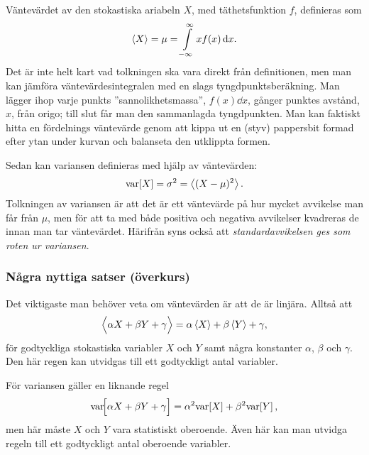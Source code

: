 \documentclass[11pt,a4paper, english, swedish
]{article}
\newcommand{\VAR}[1]{\ensuremath\text{var}\!\left[#1\right]}
\begin{document}
Väntevärdet av den stokastiska ariabeln $X$, med täthetsfunktion $f$,
definieras som 
\begin{equation}\label{eq:ev}
\ev{X} = \mu = \int_{-\infty}^\infty x f(x)\id{x}.
\end{equation}
Det är inte helt kart vad tolkningen ska vara direkt från
definitionen, men man kan jämföra väntevärdesintegralen med en slags
tyngdpunktsberäkning. Man lägger ihop varje punkts
''sannolikhetsmassa'', $f(x)\dd{x}$, gånger punktes avstånd, $x$, från
origo; till slut får man den sammanlagda tyngdpunkten. Man kan
faktiskt hitta en fördelnings väntevärde genom att kippa ut en (styv)
pappersbit formad efter ytan under kurvan och balanseta den utklippta formen. 

Sedan kan variansen definieras med hjälp av väntevärden:
\begin{equation}\label{eq:var}
\VAR{X} = \sigma^2 =\ev{(X-\mu)^2}. %
\end{equation}
Tolkningen av variansen är att det är ett väntevärde på hur
mycket avvikelse man får från $\mu$, men för att ta med både positiva
och negativa avvikelser kvadreras de innan man tar väntevärdet.
Härifrån syns också att \emph{standardavvikelsen ges som roten ur
variansen}. 

\subsubsection{Några nyttiga satser (överkurs)}
Det viktigaste man behöver veta om väntevärden är att de är
linjära. Alltså att
\begin{equation}\label{eq:ev_lin}
\Big\langle \alpha X + \beta Y + \gamma \Big\rangle 
= \alpha\ev{X} + \beta\ev{Y} + \gamma,
\end{equation}
för godtyckliga stokastiska variabler $X$ och $Y$ samt några
konstanter $\alpha$, $\beta$ och $\gamma$. Den här regen kan utvidgas
till ett godtyckligt antal variabler. 

För variansen gäller en liknande regel 
\begin{equation}\label{eq:var_lin}
\text{var}\!\Big[ \alpha X + \beta Y + \gamma \Big] 
= \alpha^2\VAR{X} + \beta^2\VAR{Y}, 
\end{equation}
men här måste $X$ och $Y$ vara statistiskt
oberoende\footnotemark{}. Även här kan man utvidga regeln till ett
godtyckligt antal oberoende variabler.
\end{document}
